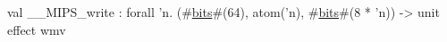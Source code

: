 val __MIPS_write : forall 'n. (#\hyperref[zbits]{bits}#(64), atom('n), #\hyperref[zbits]{bits}#(8 * 'n)) -> unit effect {wmv}
